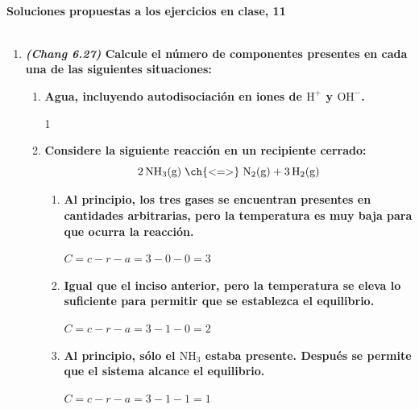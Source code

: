\documentclass[a4paper,12pt]{article}
\begin{document}

\begin{center}
\HRule \\[0.4cm]
{ \bfseries Soluciones propuestas a los ejercicios en clase, 11}\\ %
\HRule \\[0.4cm]
\end{center}


\begin{enumerate}

 \item \textbf{\textit{(Chang 6.27)} Calcule el n\'umero de componentes presentes en cada una de las siguientes situaciones:}
\begin{enumerate}
 \item \textbf{Agua, incluyendo autodisociaci\'on en iones de $\mbox{H}^+$ y $\mbox{OH}^-$.}

1 %

 \item \textbf{Considere la siguiente reacci\'on en un recipiente cerrado:}
$$2\,\mbox{NH}_3\mbox{(g)}\;\ch{ <=> }\;\mbox{N}_2\mbox{(g)}+3\,\mbox{H}_2\mbox{(g)}$$
 \begin{enumerate}
  \item \textbf{Al principio, los tres gases se encuentran presentes en cantidades arbitrarias, pero la temperatura es muy baja para que ocurra la reacci\'on.}

$C=c-r-a=3-0-0=3$ %

  \item \textbf{Igual que el inciso anterior, pero la temperatura se eleva lo suficiente para permitir que se establezca el equilibrio.}

$C=c-r-a=3-1-0=2$ %

  \item \textbf{Al principio, s\'olo el $\mbox{NH}_3$ estaba presente. Despu\'es se permite que el sistema alcance el equilibrio.}

$C=c-r-a=3-1-1=1$ %

 \end{enumerate}
\end{enumerate} %


\end{enumerate}
\end{document}
